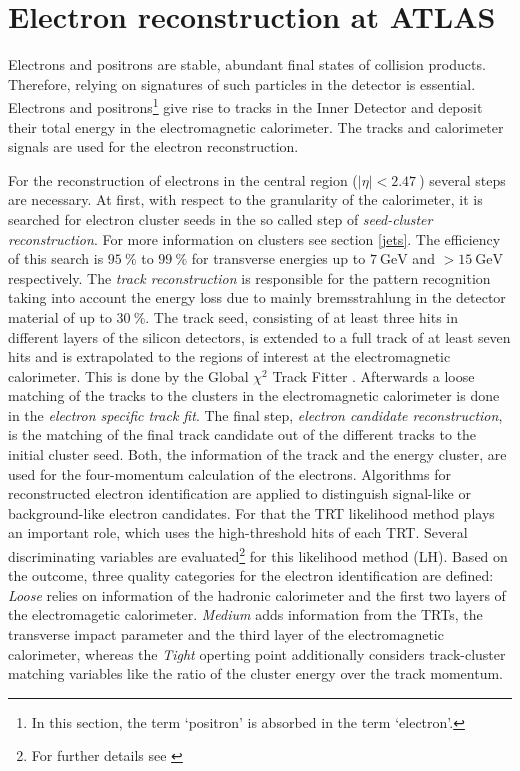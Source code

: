 \section{Electron reconstruction at ATLAS}\label{eReconstruction}
Electrons and positrons are stable, abundant final states of collision products. Therefore, relying on signatures of such particles in the detector is essential. Electrons and positrons\footnote{In this section, the term `positron' is absorbed in the term `electron'.} give rise to tracks in the Inner Detector and deposit their total energy in the electromagnetic calorimeter. The tracks and calorimeter signals are used for the electron reconstruction. \cite{ePerformance}\par
For the reconstruction of electrons in the central region ($|\eta|<\SI{2.47}{}$) several steps are necessary. At first, with respect to the granularity of the calorimeter, it is searched for electron cluster seeds in the so called step of \textit{seed-cluster reconstruction}. For more information on clusters see section \ref{jets}. The efficiency of this search is $\SI{95}{\percent}$ to $\SI{99}{\percent}$ for transverse energies up to $\SI{7}{\giga\electronvolt}$ and $>\SI{15}{\giga\electronvolt}$ respectively. The \textit{track reconstruction} is responsible for the pattern recognition taking into account the energy loss due to mainly bremsstrahlung in the detector material of up to $\SI{30}{\percent}$. The track seed, consisting of at least three hits in different layers of the silicon detectors, is extended to a full track of at least seven hits and is extrapolated to the regions of interest at the electromagnetic calorimeter. This is done by the {\ATLAS} Global $\chi^2$ Track Fitter \cite{trackfitter}. Afterwards a loose matching of the tracks to the clusters in the electromagnetic calorimeter is done in the \textit{electron specific track fit}. The final step, \textit{electron candidate reconstruction}, is the matching of the final track candidate out of the different tracks to the initial cluster seed. \cite{ePerformance}\newline
Both, the information of the track and the energy cluster, are used for the four-momentum calculation of the electrons. Algorithms for reconstructed electron identification are applied to distinguish signal-like or background-like electron candidates. For that the TRT likelihood method plays an important role, which uses the high-threshold hits of each TRT. Several discriminating variables are evaluated\footnote{For further details see \cite{ePerformance}} for this likelihood method (LH). Based on the outcome, three quality categories for the electron identification are defined: \textit{Loose} relies on information of the hadronic calorimeter and the first two layers of the electromagetic calorimeter. \textit{Medium} adds information from the TRTs, the transverse impact parameter and the third layer of the electromagnetic calorimeter, whereas the \textit{Tight} operting point additionally considers track-cluster matching variables like the ratio of the cluster energy over the track momentum. \cite{ePerformance}\newline
